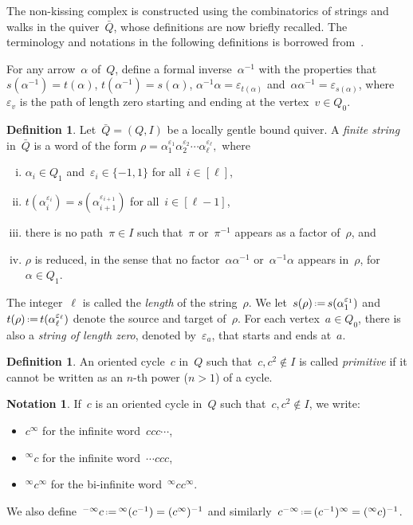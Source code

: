 \documentclass{amsart}
\theoremstyle{definition}
\newtheorem{definition}[theorem]{Definition}
\newtheorem{notation}[theorem]{Notation}
\newcommand{\eqdef}{\mbox{\,\raisebox{0.2ex}{\scriptsize\ensuremath{\mathrm:}}\ensuremath{=}\,}} %
\newcommand{\darkblue}{\color{darkblue}} %
\newcommand{\defn}[1]{\textsl{\darkblue #1}} %
\begin{document}
The non-kissing complex is constructed using the combinatorics of strings and walks in the quiver~$\bar Q$, whose definitions are now briefly recalled.
The terminology and notations in the following definitions is borrowed from~\cite{ButlerRingel, Crawley-Boevey}.

For any arrow~$\alpha$ of~$Q$, define a formal inverse~$\alpha^{-1}$ with the properties that~${s(\alpha^{-1}) = t(\alpha)}$, $t(\alpha^{-1}) = s(\alpha)$, $\alpha^{-1}\alpha = \varepsilon_{t(\alpha)}$ and~$\alpha\alpha^{-1} = \varepsilon_{s(\alpha)}$, where~$\varepsilon_v$ is the path of length zero starting and ending at the vertex~$v \in Q_0$.

\begin{definition}
\label{def:string}
Let~$\bar Q = (Q,I)$ be a locally gentle bound quiver.
A \defn{finite string} in~$\bar Q$ is a word of the form
\(
\rho = \alpha_1^{\varepsilon_1}\alpha_2^{\varepsilon_2}\cdots \alpha_\ell^{\varepsilon_\ell},
\)
where
	\begin{enumerate}[(i)]
	\item $\alpha_i \in Q_1$ and~$\varepsilon_i \in \{-1,1\}$ for all~$i \in [\ell]$,
	\item $t(\alpha_i^{\varepsilon_i}) = s(\alpha_{i+1}^{\varepsilon_{i+1}})$ for all~$i \in [\ell-1]$,
	\item there is no path~$\pi \in I$ such that~$\pi$ or~$\pi^{-1}$ appears as a factor of~$\rho$, and
	\item $\rho$ is reduced, in the sense that no factor~$\alpha\alpha^{-1}$ or~$\alpha^{-1}\alpha$ appears in~$\rho$, for~$\alpha \in Q_1$.
	\end{enumerate}
The integer~$\ell$ is called the \defn{length} of the string~$\rho$.
We let~$s(\rho) \eqdef s(\alpha_1^{\varepsilon_1})$ and~$t(\rho) \eqdef t(\alpha_\ell^{\varepsilon_\ell})$ denote the source and target of~$\rho$.
For each vertex~$a \in Q_0$, there is also a \defn{string of length zero}, denoted by~$\varepsilon_a$, that starts and ends at~$a$.
\end{definition}

\begin{definition}
An oriented cycle~$c$ in~$Q$ such that~$c, c^2 \notin I$ is called \defn{primitive} if it cannot be written as an $n$-th power ($n>1$) of a cycle.
\end{definition}

\begin{notation}
If~$c$ is an oriented cycle in~$Q$ such that~$c, c^2 \notin I$, we write:
\begin{itemize}
\item $c^\infty$ for the infinite word~$c c c\cdots$,
\item ${}^\infty c$ for the infinite word~$\cdots c c c$,
\item $^\infty c^\infty$ for the bi-infinite word~$^\infty c c^\infty$.
\end{itemize}
We also define~${}^{-\infty}c \eqdef {}^{\infty}(c^{-1}) = (c^\infty)^{-1}$ and similarly~$c^{-\infty} \eqdef (c^{-1})^\infty = (^\infty c)^{-1}$.
\end{notation}
\end{document}
